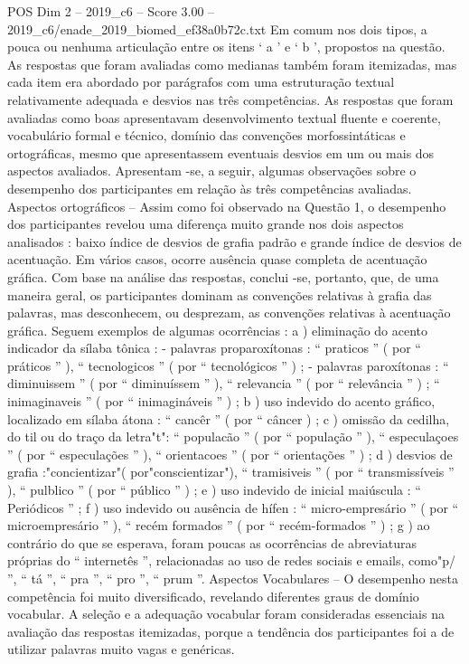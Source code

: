 \begin{textsample}{POS Dim 2 – 2019\_c6 – Score 3.00 – 2019\_c6/enade\_2019\_biomed\_ef38a0b72c.txt}
Em comum nos dois tipos, a pouca ou nenhuma articulação entre os itens ‘ a ’ e ‘ b ’, propostos na questão.
As respostas que foram avaliadas como medianas também foram itemizadas, mas cada item era abordado por parágrafos com uma estruturação textual relativamente adequada e desvios nas três competências.
As respostas que foram avaliadas como boas apresentavam desenvolvimento textual fluente e coerente, vocabulário formal e técnico, domínio das convenções morfossintáticas e ortográficas, mesmo que apresentassem eventuais desvios em um ou mais dos aspectos avaliados.
Apresentam -se, a seguir, algumas observações sobre o desempenho dos participantes em relação às três competências avaliadas.
Aspectos ortográficos – Assim como foi observado na Questão 1, o desempenho dos participantes revelou uma diferença muito grande nos dois aspectos analisados : baixo índice de desvios de grafia padrão e grande índice de desvios de acentuação.
Em vários casos, ocorre ausência quase completa de acentuação gráfica.
Com base na análise das respostas, conclui -se, portanto, que, de uma maneira geral, os participantes dominam as convenções relativas à grafia das palavras, mas desconhecem, ou desprezam, as convenções relativas à acentuação gráfica.
Seguem exemplos de algumas ocorrências : a ) eliminação do acento indicador da sílaba tônica : - palavras proparoxítonas : “ praticos ” ( por “ práticos ” ), “ tecnologicos ” ( por “ tecnológicos ” ) ; - palavras paroxítonas : “ diminuissem ” ( por “ diminuíssem ” ), “ relevancia ” ( por “ relevância ” ) ; “ inimaginaveis ” ( por “ inimagináveis ” ) ; b ) uso indevido do acento gráfico, localizado em sílaba átona : “ cancêr ” ( por “ câncer ) ; c ) omissão da cedilha, do til ou do traço da letra"t": “ populacão ” ( por “ população ” ), “ especulaçoes ” ( por “ especulações ” ), “ orientacoes ” ( por “ orientações ” ) ; d ) desvios de grafia :"concientizar"( por"conscientizar"), “ tramisiveis ” ( por “ transmissíveis ” ), “ pulblico ” ( por “ público ” ) ; e ) uso indevido de inicial maiúscula : “ Periódicos ” ; f ) uso indevido ou ausência de hífen : “ micro-empresário ” ( por “ microempresário ” ), “ recém formados ” ( por “ recém-formados ” ) ; g ) ao contrário do que se esperava, foram poucas as ocorrências de abreviaturas próprias do “ internetês ”, relacionadas ao uso de redes sociais e emails, como"p/ ”, “ tá ”, “ pra ”, “ pro ”, “ prum ”.
Aspectos Vocabulares – O desempenho nesta competência foi muito diversificado, revelando diferentes graus de domínio vocabular.
A seleção e a adequação vocabular foram consideradas essenciais na avaliação das respostas itemizadas, porque a tendência dos participantes foi a de utilizar palavras muito vagas e genéricas.

\end{textsample}
